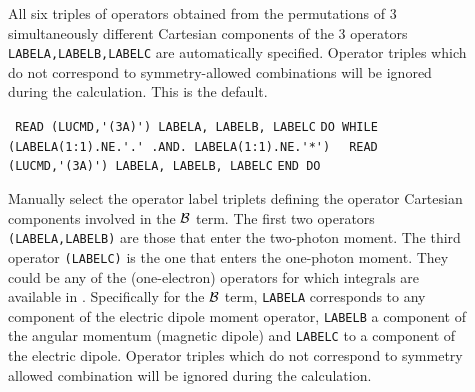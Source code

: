 \begin{description}
\item[] 
All six triples of operators obtained from the
permutations of 3 simultaneously different 
Cartesian components of the 3 operators 
\verb+LABELA,LABELB,LABELC+ are automatically specified.
Operator triples which do not correspond to symmetry-allowed
combinations will be ignored during the calculation.
This is the default.

\item[] \verb| |\newline
\verb|READ (LUCMD,'(3A)') LABELA, LABELB, LABELC|\newline
\verb|DO WHILE (LABELA(1:1).NE.'.' .AND. LABELA(1:1).NE.'*')|\newline
\verb|  READ (LUCMD,'(3A)') LABELA, LABELB, LABELC|\newline
\verb|END DO|
%

Manually select the operator label triplets defining the operator
Cartesian components involved in the ${\cal B}$ term. 
The first two operators \verb+(LABELA,LABELB)+
are those that enter the two-photon moment.
The third operator \verb+(LABELC)+ 
is the one that enters the one-photon 
moment. They could be any of the (one-electron)
operators for which integrals are available in 
.
Specifically for the ${\cal{B}}$ term, \verb+LABELA+
corresponds to any component of the electric dipole 
moment operator, \verb+LABELB+ a component of the
angular momentum (magnetic dipole) and
\verb+LABELC+ to a component of the electric dipole.
Operator triples which do not correspond to symmetry allowed
combination will be ignored during the calculation.


\end{description}
